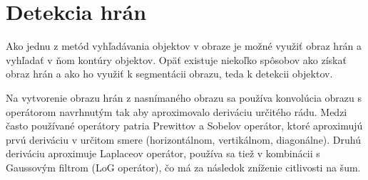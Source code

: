 \section{Detekcia hrán}

    Ako jednu z metód vyhľadávania objektov v obraze je možné využiť obraz hrán a vyhľadať v ňom kontúry objektov. Opäť existuje niekoľko spôsobov ako získať obraz hrán a ako ho využiť k segmentácii obrazu, teda k detekcii objektov.

    Na vytvorenie obrazu hrán z nasnímaného obrazu sa používa konvolúcia obrazu s operátorom navrhnutým tak aby aproximovalo deriváciu určitého rádu. Medzi často používané operátory patria Prewittov a Sobelov operátor, ktoré aproximujú prvú deriváciu v určitom smere (horizontálnom, vertikálnom, diagonálne). Druhú deriváciu aproximuje Laplaceov operátor, používa sa tiež v kombinácii s Gaussovým filtrom (LoG operátor), čo má za následok zníženie citlivosti na šum.

